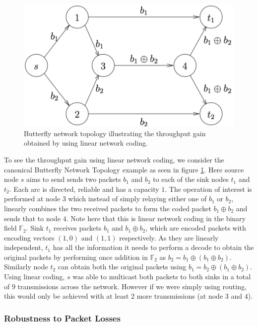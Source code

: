 \documentclass[12pt,a4paper,twoside,openright]{report}
\begin{document}
\begin{figure}[tbh]
	\centerline{\includegraphics[scale=0.9]{figs/butterfly}}
	\caption{Butterfly network topology illustrating the throughput gain obtained by using linear network coding.\cite{nc-intro}}
	\label{fig:butterfly}
\end{figure}

To see the throughput gain using linear network coding, we consider the canonical Butterfly Network Topology example as seen in figure \ref{fig:butterfly}. Here source node $s$ aims to send sends two packets $b_1$ and $b_2$ to each of the sink nodes $t_1$ and $t_2$. Each arc is directed, reliable and has a capacity $1$. The operation of interest is performed at node $3$ which instead of simply relaying either one of $b_1$ or $b_2$, linearly combines the two received packets to form the coded packet $b_1 \oplus b_2$ and sends that to node $4$. Note here that this is linear network coding in the binary field $\mathbb{F}_2$. Sink $t_1$ receives packets $b_1$ and $b_1 \oplus b_2$, which are encoded packets with encoding vectors $(1, 0)$ and $(1, 1)$ respectively. As they are linearly independent, $t_1$ has all the information it needs to perform a decode to obtain the original packets by performing once addition in $\mathbb F _2$ as $b_2 = b_1 \oplus (b_1 \oplus b_2 )$. Similarly node $t_2$ can obtain both the original packets using $b_1 = b_2 \oplus (b_1 \oplus b_2 )$. Using linear coding, $s$ was able to multicast both packets to both sinks in a total of $9$ transmissions across the network. However if we were simply using routing, this would only be achieved with at least 2 more transmissions (at node $3$ and $4$).

\subsubsection{Robustness to Packet Losses}
\end{document}
